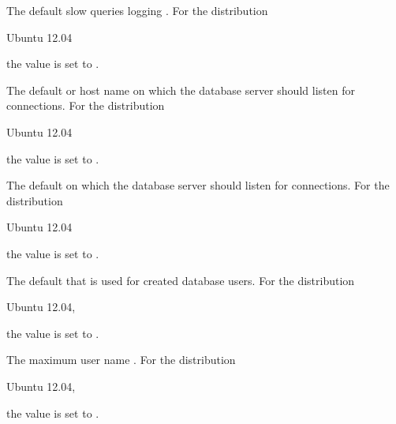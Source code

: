 The default slow queries logging .
For the distribution
\begin{inparaitem}
\item[\TheDistribution{ubuntu}] Ubuntu 12.04
\end{inparaitem}
the value is set to .


The default  or host name on which the database server should
listen for connections. For the distribution
\begin{inparaitem}
\item[\TheDistribution{ubuntu}] Ubuntu 12.04
\end{inparaitem}
the value is set to .
 

The default  on which the database server should
listen for connections. For the distribution
\begin{inparaitem}
\item[\TheDistribution{ubuntu}] Ubuntu 12.04
\end{inparaitem}
the value is set to .
 

The default  that is used for created database users.
For the distribution
\begin{inparaitem}
\item[\TheDistribution{ubuntu}] Ubuntu 12.04,
\end{inparaitem}
the value is set to .
 

The maximum user name .
For the distribution
\begin{inparaitem}
\item[\TheDistribution{ubuntu}] Ubuntu 12.04,
\end{inparaitem}
the value is set to .
 
